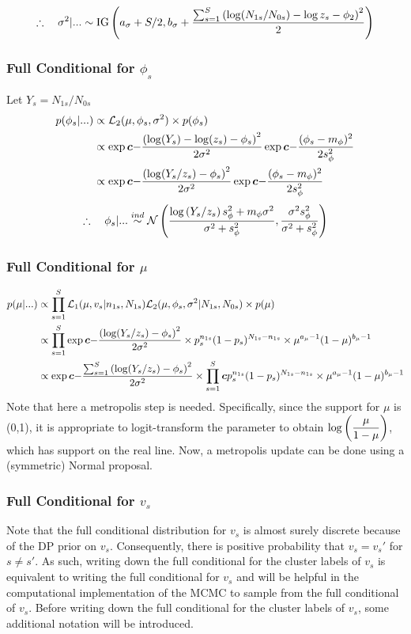 \documentclass[12pt]{article}
\newcommand{\bc}{\mbox{\boldmath $c$}}
\begin{document}
$$
\therefore ~~~ \sigma^2|... \sim \text{IG}\left(a_\sigma+S/2, b_\sigma+\frac{\sum_{s=1}^S\left(\log(N_{1s}/N_{0s})-\log z_s-\phi_2\right)^2}{2}\right)
$$

\subsubsection{Full Conditional for $\phi_s$}
Let $Y_s = N_{1s}/N_{0s}$
\begin{align*}
  p(\phi_s|...) &\propto\L_2(\mu,\phi_s,\sigma^2) \times p(\phi_s)\\
                &\propto\exp\bc{-\frac{\p{\log(Y_s)-\log(z_s)-\phi_s}^2}{2\sigma^2}}
  \exp\bc{-\frac{(\phi_s-m_\phi)^2}{2s_\phi^2}}\\
                &\propto\exp\bc{-\frac{\p{\log(Y_s/z_s)-\phi_s}^2}{2\sigma^2}} 
  \exp\bc{-\frac{(\phi_s-m_\phi)^2}{2s_\phi^2}}\\
\end{align*}
$$
\therefore ~~~ \phi_s | ... \overset{ind}{\sim}  \mathcal N\left(\frac{\log\left(Y_s/z_s\right)s_\phi^2+m_\phi\sigma^2}{\sigma^2+s_\phi^2},\frac{\sigma^2 s_\phi^2}{\sigma^2+s_\phi^2}\right)
$$

\subsubsection{Full Conditional for $\mu$}
\begin{align*}
  p(\mu|...) &\propto \prods \L_1(\mu,v_s|n_{1s},N_{1s})\L_2(\mu,\phi_s,\sigma^2|N_{1s},N_{0s}) \times p(\mu) \\
             &\propto \prods \exp\bc{-\frac{\p{\log(Y_s/z_s)-\phi_s}^2}{2\sigma^2}} \times p_s^{n_{1s}} (1-p_s)^{N_{1s}-n_{1s}} \times \mu^{a_\mu-1} (1-\mu)^{b_\mu-1}\\
             &\propto \exp\bc{-\frac{\sums\p{\log(Y_s/z_s)-\phi_s}^2}{2\sigma^2}} \times \prods\bc{p_s^{n_{1s}} (1-p_s)^{N_{1s}-n_{1s}}} \times \mu^{a_\mu-1} (1-\mu)^{b_\mu-1}\\
\end{align*}
Note that here a metropolis step is needed. Specifically, since the support for
$\mu$ is (0,1), it is appropriate to logit-transform the parameter to obtain
$\log\left(\displaystyle\frac{\mu}{1-\mu}\right)$, which has support on the real line. Now, a
metropolis update can be done using a (symmetric) Normal proposal.

\subsubsection{Full Conditional for $v_s$}
Note that the full conditional distribution for $v_s$ is almost surely discrete because of the DP prior on $v_s$. 
Consequently, there is positive probability that $v_s=v_s'$ for $s\ne s'$. As such, writing down the full conditional for
the cluster labels of $v_s$ is equivalent to writing the full conditional for $v_s$ and will be helpful in the computational
implementation of the MCMC to sample from the full conditional of $v_s$. Before writing down the full conditional for the
cluster labels of $v_s$, some additional notation will be introduced.
\end{document}
